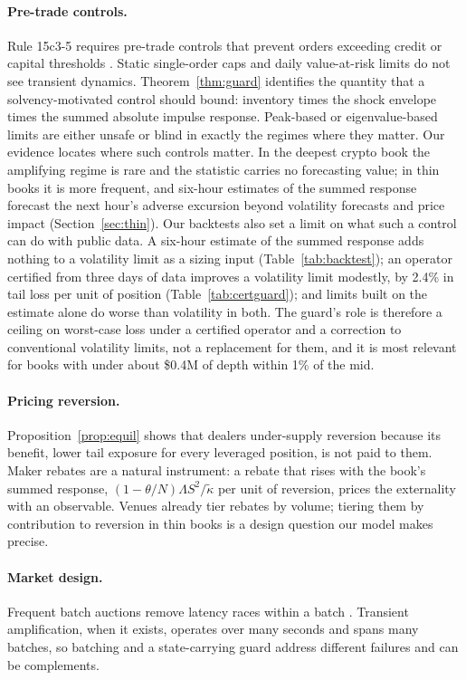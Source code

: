 \documentclass[12pt]{article}
\theoremstyle{definition}
\theoremstyle{remark}
\begin{document}
\paragraph{Pre-trade controls.} Rule 15c3-5 requires pre-trade controls that prevent orders exceeding credit or capital thresholds \citep{sec2010}. Static single-order caps and daily value-at-risk limits do not see transient dynamics. Theorem~\ref{thm:guard} identifies the quantity that a solvency-motivated control should bound: inventory times the shock envelope times the summed absolute impulse response. Peak-based or eigenvalue-based limits are either unsafe or blind in exactly the regimes where they matter. Our evidence locates where such controls matter. In the deepest crypto book the amplifying regime is rare and the statistic carries no forecasting value; in thin books it is more frequent, and six-hour estimates of the summed response forecast the next hour's adverse excursion beyond volatility forecasts and price impact (Section~\ref{sec:thin}). Our backtests also set a limit on what such a control can do with public data. A six-hour estimate of the summed response adds nothing to a volatility limit as a sizing input (Table~\ref{tab:backtest}); an operator certified from three days of data improves a volatility limit modestly, by 2.4\% in tail loss per unit of position (Table~\ref{tab:certguard}); and limits built on the estimate alone do worse than volatility in both. The guard's role is therefore a ceiling on worst-case loss under a certified operator and a correction to conventional volatility limits, not a replacement for them, and it is most relevant for books with under about \$0.4M of depth within 1\% of the mid.

\paragraph{Pricing reversion.} Proposition~\ref{prop:equil} shows that dealers under-supply reversion because its benefit, lower tail exposure for every leveraged position, is not paid to them. Maker rebates are a natural instrument: a rebate that rises with the book's summed response, $(1-\theta/N)\Lambda S^2/\tilde\kappa$ per unit of reversion, prices the externality with an observable. Venues already tier rebates by volume; tiering them by contribution to reversion in thin books is a design question our model makes precise.

\paragraph{Market design.} Frequent batch auctions remove latency races within a batch \citep{budish2015}. Transient amplification, when it exists, operates over many seconds and spans many batches, so batching and a state-carrying guard address different failures and can be complements.
\end{document}
